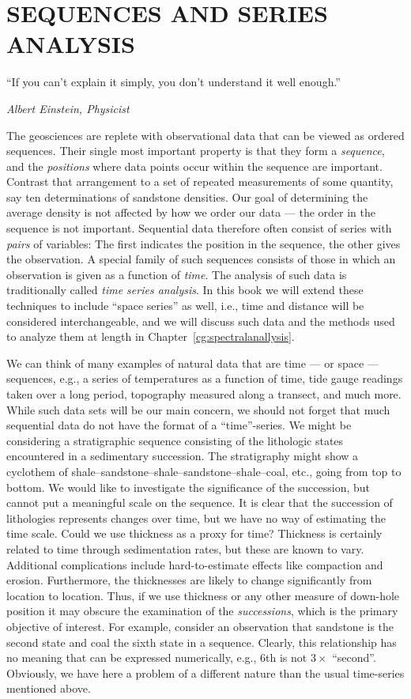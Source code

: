 %
\chapter{SEQUENCES AND SERIES ANALYSIS}
\label{ch:sequences}
\epigraph{``If you can't explain it simply, you don't understand it well enough.''}{\textit{Albert Einstein, Physicist}}
	The geosciences are replete with observational data that can be viewed as ordered sequences.  
Their single most important property is that they form a \emph{sequence}, and the \emph{positions} where 
data points occur within the sequence are important.  Contrast that arrangement to a set of repeated 
measurements of some quantity, say ten determinations of sandstone densities.  Our goal of 
determining the average density is not affected by how we order our data --- the order in the 
sequence is not important.  Sequential data therefore often consist of series with \emph{pairs} of 
variables:  The first indicates the position in the sequence, the other gives the observation.  A 
special family of such sequences consists of those in which an observation is given as a function of \emph{time}.  
The analysis of such data is traditionally called \emph{time series analysis}.  In this book we will 
extend these techniques to include ``space series'' as well, i.e., time and distance will be 
considered interchangeable, and we will discuss such data and the methods used to analyze them at
length in Chapter~\ref{cg:spectralanallysis}.
 
      We can think of many examples of natural data that are time --- or space ---
sequences, e.g., a series of temperatures as a function of time, tide gauge readings taken over  a 
long period, topography measured along a transect, and much more.  While such data sets will be our 
main concern, we should not forget that much sequential data do not have the format 
of a ``time''-series.  We might be considering a stratigraphic sequence consisting of the lithologic 
states encountered in a sedimentary succession.  The stratigraphy might show a cyclothem of 
shale--sandstone--shale--sandstone--shale--coal, etc., going from top to bottom.  We would like to 
investigate the significance of the succession, but cannot put a meaningful scale on the sequence.  
It is clear that the succession of lithologies represents changes over time, but we have no way of 
estimating the time scale.  Could we use thickness as a proxy for time?  Thickness is certainly related 
to time through sedimentation rates, but these are known to vary.  Additional complications include 
hard-to-estimate effects like compaction and erosion.  Furthermore, the thicknesses are likely to change 
significantly from location to location.  Thus, if we use thickness or any other measure of down-hole
position it may obscure the examination of the \emph{successions}, which is the primary objective of interest. 
For example, consider an observation that sandstone is the second state and coal the sixth state
in a sequence.  Clearly, this relationship has no meaning that can be 
expressed numerically, e.g., 6th is not $3 \times$ ``second''.  Obviously, we have here a problem of a 
different nature than the usual time-series mentioned above.  

